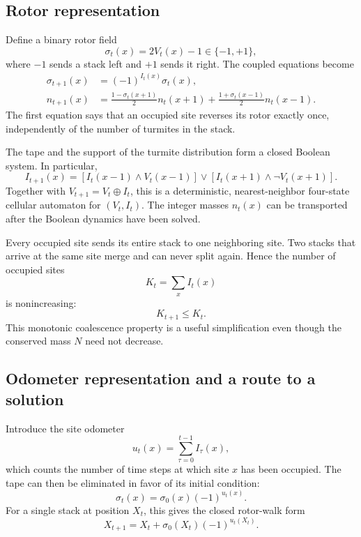 \documentclass{article}
\begin{document}
\subsection{Rotor representation}

Define a binary rotor field
\begin{equation}
\sigma_t(x)=2V_t(x)-1 \in \{-1,+1\},
\end{equation}
where $-1$ sends a stack left and $+1$ sends it right.  The coupled equations
become
\begin{align}
\sigma_{t+1}(x)
&= (-1)^{I_t(x)}\sigma_t(x), \\
n_{t+1}(x)
&= \frac{1-\sigma_t(x+1)}{2}n_t(x+1)
+ \frac{1+\sigma_t(x-1)}{2}n_t(x-1).
\end{align}
The first equation says that an occupied site reverses its rotor exactly once,
independently of the number of turmites in the stack.

The tape and the support of the turmite distribution form a closed Boolean
system.  In particular,
\begin{equation}
\boxed{
I_{t+1}(x)
= \left[I_t(x-1)\land V_t(x-1)\right]
\lor
\left[I_t(x+1)\land \neg V_t(x+1)\right].
}
\end{equation}
Together with $V_{t+1}=V_t\oplus I_t$, this is a deterministic, nearest-neighbor
four-state cellular automaton for $(V_t,I_t)$.  The integer masses $n_t(x)$ can
be transported after the Boolean dynamics have been solved.

Every occupied site sends its entire stack to one neighboring site.  Two
stacks that arrive at the same site merge and can never split again.  Hence
the number of occupied sites
\begin{equation}
K_t=\sum_x I_t(x)
\end{equation}
is nonincreasing:
\begin{equation}
K_{t+1}\leq K_t.
\end{equation}
This monotonic coalescence property is a useful simplification even though the
conserved mass $N$ need not decrease.

\subsection{Odometer representation and a route to a solution}

Introduce the site odometer
\begin{equation}
u_t(x)=\sum_{\tau=0}^{t-1} I_\tau(x),
\end{equation}
which counts the number of time steps at which site $x$ has been occupied.
The tape can then be eliminated in favor of its initial condition:
\begin{equation}
\sigma_t(x)=\sigma_0(x)(-1)^{u_t(x)}.
\end{equation}
For a single stack at position $X_t$, this gives the closed rotor-walk form
\begin{equation}
X_{t+1}
= X_t + \sigma_0(X_t)(-1)^{u_t(X_t)}.
\end{equation}
\end{document}
